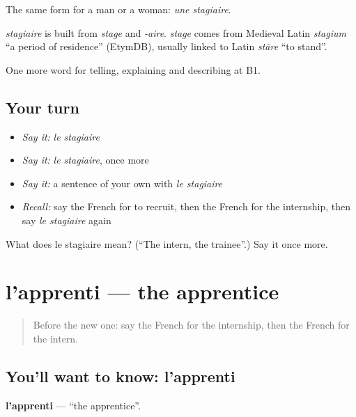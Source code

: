 The same form for a man or a woman: \emph{une stagiaire}.

\begin{cousinweb}
\emph{stagiaire} is built from \emph{stage} and \emph{-aire}. \emph{stage} comes from Medieval Latin \emph{stagium} \textquotedblleft{}a period of residence\textquotedblright{} (EtymDB), usually linked to Latin \emph{stāre} \textquotedblleft{}to stand\textquotedblright{}.
\end{cousinweb}

\begin{grammarlens}[title={What you've built}]
One more word for telling, explaining and describing at B1.
\end{grammarlens}

\subsection*{Your turn}
\begin{itemize}
\raggedright
  \item \emph{Say it:} \emph{le stagiaire}
  \item \emph{Say it:} \emph{le stagiaire}, once more
  \item \emph{Say it:} a sentence of your own with \emph{le stagiaire}
  \item \emph{Recall:} say the French for to recruit, then the French for the internship, then say \emph{le stagiaire} again
\end{itemize}

\begin{tcolorbox}[breakable,colback=teal!4,colframe=teal!35!black,title={Before you move on}]
What does le stagiaire mean? (\textquotedblleft{}The intern, the trainee\textquotedblright{}.) Say it once more.
\end{tcolorbox}
\section[l'apprenti]{l'apprenti — the apprentice}

\label{lesson:FR-C357-apprenti}



\begin{quote}
Before the new one: say the French for the internship, then the French for the intern.
\end{quote}

\subsection*{You'll want to know: l'apprenti}
\textbf{l'apprenti} — \textquotedblleft{}the apprentice\textquotedblright{}.

